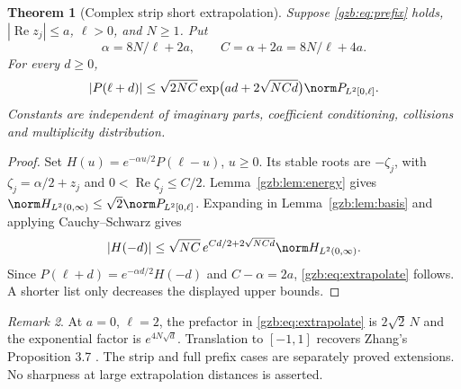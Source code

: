 \documentclass[11pt,a4paper]{article}
\numberwithin{equation}{section}
\newtheorem{theorem}{Theorem}[section]
\theoremstyle{definition}\newtheorem{definition}[theorem]{Definition}
\theoremstyle{remark}\newtheorem{remark}[theorem]{Remark}
\DeclareMathOperator{\Rea}{Re}\DeclareMathOperator{\Ima}{Im}
\begin{document}
\begin{theorem}[Complex strip short extrapolation]\label{gzb:thm:extrapolate}
Suppose \eqref{gzb:eq:prefix} holds, $|\Rea z_j|\le a$, $\ell>0$, and
$N\ge1$. Put
\begin{equation}\label{gzb:eq:C}
 \alpha=8N/\ell+2a,\qquad C=\alpha+2a=8N/\ell+4a.
\end{equation}
For every $d\ge0$,
\begin{equation}\label{gzb:eq:extrapolate}
 |P(\ell+d)|\le\sqrt{2NC}
     \exp\bigl(ad+2\sqrt{NCd}\bigr)\norm P_{L^2[0,\ell]}.
\end{equation}
Constants are independent of imaginary parts, coefficient conditioning,
collisions and multiplicity distribution.
\end{theorem}
\begin{proof}
Set $H(u)=e^{-\alpha u/2}P(\ell-u)$, $u\ge0$.
Its stable roots are $-\zeta_j$, with
$\zeta_j=\alpha/2+z_j$ and $0<\Rea\zeta_j\le C/2$.
Lemma~\ref{gzb:lem:energy} gives
$\norm H_{L^2(0,\infty)}\le\sqrt2\norm P_{L^2[0,\ell]}$.
Expanding in Lemma~\ref{gzb:lem:basis} and applying Cauchy--Schwarz gives
\[
 |H(-d)|\le\sqrt{NC}\,e^{Cd/2+2\sqrt{NCd}}
                                      \norm H_{L^2(0,\infty)}.
\]
Since $P(\ell+d)=e^{-\alpha d/2}H(-d)$ and $C-\alpha=2a$,
\eqref{gzb:eq:extrapolate} follows. A shorter list only decreases the
displayed upper bounds.
\end{proof}
\begin{remark}\label{gzb:rem:zhang}
At $a=0$, $\ell=2$, the prefactor in \eqref{gzb:eq:extrapolate} is
$2\sqrt2\,N$ and the exponential factor is $e^{4N\sqrt d}$.
Translation to $[-1,1]$ recovers Zhang's Proposition 3.7 \cite{Zhang}.
The strip and full prefix cases are separately proved extensions.
No sharpness at large extrapolation distances is asserted.
\end{remark}
\end{document}
